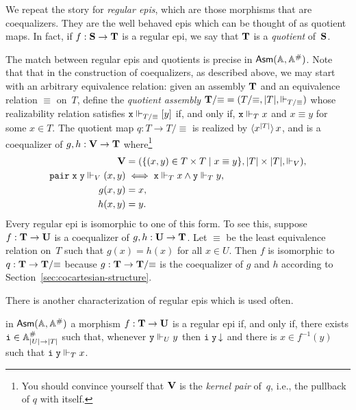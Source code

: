 We repeat the story for \emph{regular epis}, which are those morphisms
that are coequalizers. They are the well behaved epis which can be
thought of as quotient maps. In fact, if $f : \mathbf{S} \to \mathbf{T}$ is
a regular epi, we say that $\mathbf{T}$ is a \emph{quotient} of~$\mathbf{S}$.

The match between regular epis and quotients is precise in $\mathsf{Asm}(\mathbb{A},\mathbb{A}^{\#})$.
Note that that in the construction of coequalizers, as described
above, we may start with an arbitrary equivalence relation: given an
assembly $\mathbf{T}$ and an equivalence relation $\equiv$ on~$T$, define
the \emph{quotient assembly} $\mathbf{T}/{\equiv} = (T/{\equiv}, |T|,
\Vdash_{T/{\equiv}})$ whose realizability relation satisfies $\mathtt{x}
\Vdash_{T/{\equiv}} [y]$ if, and only if, $\mathtt{x} \Vdash_T x$ and $x \equiv
y$ for some $x \in T$. The quotient map $q : T \to T/{\equiv}$ is
realized by $\langle x^{|T|} \rangle\,x$, and is a coequalizer of $g,
h : \mathbf{V} \to \mathbf{T}$ where\footnote{You should convince yourself
  that $\mathbf{V}$ is the \emph{kernel pair} of~$q$, i.e., the pullback
  of $q$ with itself.}
%
\begin{align*}
  \mathbf{V} &= (\{(x,y) \in T \times T \mid x \equiv y\},
             |T| \times |T|, {\Vdash_V}),\\
  \mathtt{pair}\;\mathtt{x}\;\mathtt{y} \Vdash_V (x,y) &\iff
  \mathtt{x} \Vdash_T x \land \mathtt{y} \Vdash_T y, \\
  g (x, y) &= x,\\
  h (x, y) &= y.
\end{align*}
%
Every regular epi is isomorphic to one of this form. To see this,
suppose $f : \mathbf{T} \to \mathbf{U}$ is a coequalizer of $g, h : \mathbf{U}
\to \mathbf{T}$. Let $\equiv$ be the least equivalence relation on~$T$
such that $g(x) = h(x)$ for all $x \in U$. Then $f$ is isomorphic to
$q : \mathbf{T} \to \mathbf{T}/{\equiv}$ because $g : \mathbf{T} \to
\mathbf{T}/{\equiv}$ is the coequalizer of $g$ and $h$ according to
Section~\ref{sec:cocartesian-structure}.

There is another characterization of regular epis which is used often.

\begin{proposition}
  \label{prop:reg-epi-when}%
  in $\mathsf{Asm}(\mathbb{A},\mathbb{A}^{\#})$ a morphism $f : \mathbf{T} \to \mathbf{U}$ is a regular epi
  if, and only if, there exists $\mathtt{i} \in \mathbb{A}^{\#}_{|U| \to |T|}$
  such that, whenever $\mathtt{y} \Vdash_U y$ then $\mathtt{i}\;\mathtt{y}\,{\downarrow}$
  and there is $x \in f^{-1}(y)$ such that $\mathtt{i}\;\mathtt{y} \Vdash_T x$.
\end{proposition}

